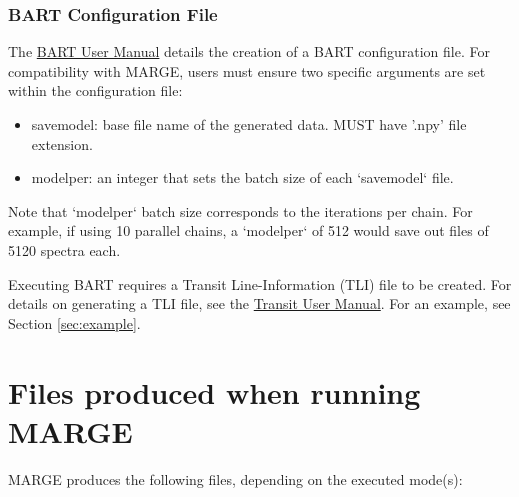 \documentclass[letterpaper, 12pt]{article}
\begin{document}
\subsubsection{BART Configuration File}
\label{sec:BARTconfig}

The \href{https://exosports.github.io/BART/doc/BART_User_Manual.html}{BART User Manual} 
details the creation of a BART configuration file.  For 
compatibility with MARGE, users must ensure two specific arguments are set 
within the configuration file:
\begin{itemize}
\item savemodel: base file name of the generated data. MUST have '.npy' file 
                 extension.
\item modelper: an integer that sets the batch size of each `savemodel` file.
\end{itemize}

\noindent Note that `modelper` batch size corresponds to the iterations per 
chain.  For example, if using 10 parallel chains, a `modelper` of 512 would 
save out files of 5120 spectra each.

\noindent  Executing BART requires a Transit Line-Information (TLI) file to 
be created.  For details on generating a TLI file, see the \href{https://exosports.github.io/transit/doc/Transit_User_Manual.html}{Transit User Manual}.
For an example, see Section \ref{sec:example}.



\section{Files produced when running MARGE}
\label{sec:outputs}

MARGE produces the following files, depending on the executed mode(s):
\end{document}
